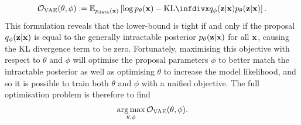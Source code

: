 \begin{equation}
    \gO_\text{VAE}(\theta, \phi) := \EX_{\pdata(\rvx)} \left[ \log p_\theta(\rvx) - \kl{q_\phi(\rvz|\rvx)}{p_\theta(\rvz|\rvx)} \right].
\end{equation}
This formulation reveals that the lower-bound is tight if and only if the proposal $q_\phi({\mathbf{z}}|{\mathbf{x}})$ is equal to the generally intractable posterior $p_\theta({\mathbf{z}}|{\mathbf{x}})$ for all ${\mathbf{x}}$, causing the KL divergence term to be zero. Fortunately, maximising this objective with respect to $\theta$ and $\phi$ will optimise the proposal parameters $\phi$ to better match the intractable posterior as well as optimising $\theta$ to increase the model likelihood, and so it is possible to train both $\theta$ and $\phi$ with a unified objective. The full optimisation problem is therefore to find
\begin{align}
    \operatorname*{arg\,max}_{\theta,\phi} {\mathcal{O}}_\text{VAE}(\theta, \phi).
\end{align}

